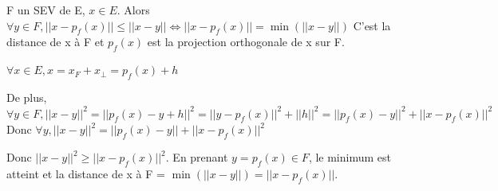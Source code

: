 \documentclass[french]{yLectureNote}
\begin{document}
\begin{proposition}
    F un SEV de E, $x\in E$. Alors $\forall y \in F, ||x-p_f(x)||\leq||x-y|| \iff ||x-p_f(x)|| = \min(||x-y||)$
    C'est la distance de x à F et $p_f(x)$ est la projection orthogonale de x sur F.
\end{proposition}
\begin{myproof}
    $\forall x\in E, x = x_F+x_\perp = p_f(x)+h$

    De plus, $\forall y\in F, ||x-y||^2 = ||p_f(x)-y+h||^2 = ||y-p_f(x)||^2 + ||h||^2 = ||p_f(x)-y||^2+||x-p_f(x)||^2$
    Donc $\forall y, ||x-y||^2 = ||p_f(x)-y||+||x-p_f(x)||^2$

    Donc $||x-y||^2\geq ||x-p_f(x)||^2$. En prenant $y = p_f(x)\in F$, le minimum est atteint et la
    distance de x à F = $\min(||x-y||) = ||x-p_f(x)||$.
\end{myproof}
\end{document}
